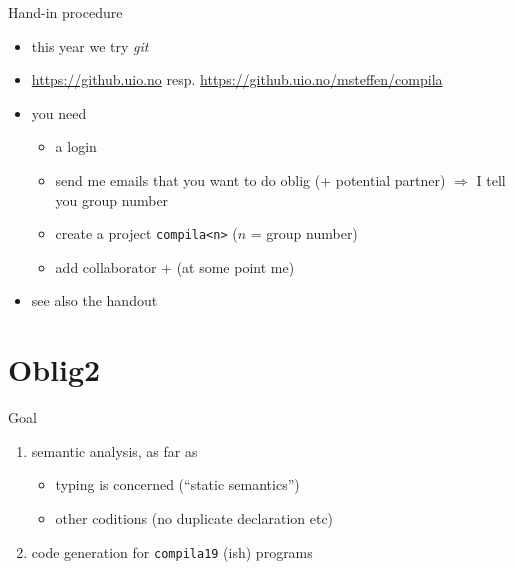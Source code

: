\documentclass{beamer}
\begin{document}
\begin{frame}[label={sec:org73477b6},fragile]{Hand-in procedure}
 \begin{itemize}
\item this year we try \emph{git}

\item \url{https://github.uio.no} resp. \url{https://github.uio.no/msteffen/compila}

\item you need

\begin{itemize}
\item a login
\item send me emails that you want to do oblig (+ potential partner)
\(\Rightarrow\) I tell you group number
\item create a project \texttt{compila<n>} (\(n\) = group number)
\item add collaborator + (at some point me)
\end{itemize}
\end{itemize}


\begin{itemize}
\item see also the handout
\end{itemize}
\end{frame}





\section{Oblig2}
\label{sec:org795fc05}


\begin{frame}[label={sec:orge5611c3},fragile]{Goal}
 \begin{enumerate}
\item \alert{semantic  analysis}, as far as 
\begin{itemize}
\item \alert{typing} is concerned (``static semantics'')
\item other coditions (no duplicate declaration etc)
\end{itemize}

\item \alert{code generation} for \texttt{compila19} (ish) programs
\end{enumerate}
\end{frame}
\end{document}
